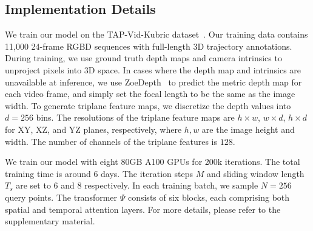 \subsection{Implementation Details}
We train our model on the TAP-Vid-Kubric dataset~\cite{tap-vid,kubric}. Our training data contains 11,000 24-frame RGBD sequences with full-length 3D trajectory annotations. During training, we use ground truth depth maps and camera intrinsics to unproject pixels into 3D space. In cases where the depth map and intrinsics are unavailable at inference, we use ZoeDepth~\cite{ZoeDepth} to predict the metric depth map for each video frame, and simply set the focal length to be the same as the image width. To generate triplane feature maps, we discretize the depth values into $d=256$ bins.
The resolutions of the triplane feature maps are $h\times w$, $w\times d$, $h\times d$ for XY, XZ, and YZ planes, respectively, where $h, w$ are the image height and width. The number of channels of the triplane features is $128$.




We train our model with eight 80GB A100 GPUs for 200k iterations. The total training time is around 6 days. The iteration steps $M$ and sliding window length $T_s$ are set to $6$ and $8$ respectively. In each training batch, we sample $N=256$ query points. The transformer $\Psi$ consists of six blocks, each comprising both spatial and temporal attention layers. For more details, please refer to the supplementary material.

